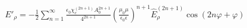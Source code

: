 \begin{equation*} \begin{aligned}
E'_\rho = - \frac{1}{2} \sum_{n=1}^{\infty} 
\frac{\epsilon_0 \chi_e^{(2n+1)} A_0^{2n+1} }{ 4^{2n+1} }
\left( \frac{\mu_0 \mu}{\epsilon_0 \epsilon} \right)^{n+1}
\hat{E}_\rho^{(2n+1)} \cos \left( 2n \varphi + \varphi \right)
\end{aligned} \end{equation*}

